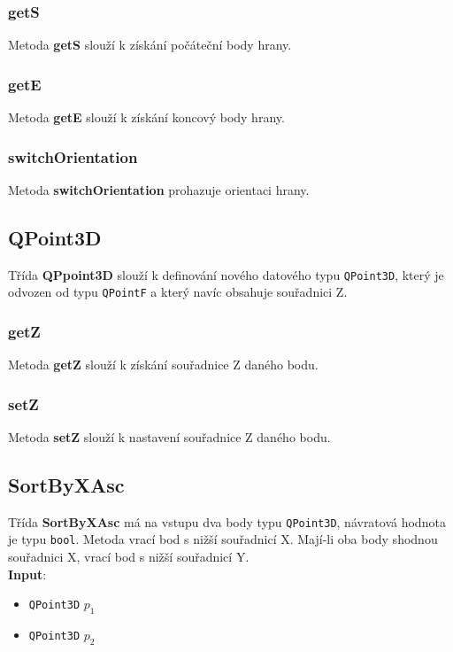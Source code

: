 \documentclass[a4paper, 12pt]{article}
\begin{document}
\subsubsection*{getS}
Metoda \textbf{getS} slouží k získání počáteční body hrany. 

\subsubsection*{getE}
Metoda \textbf{getE} slouží k získání koncový body hrany. 

\subsubsection*{switchOrientation}
Metoda \textbf{switchOrientation} prohazuje orientaci hrany.  


\subsection{QPoint3D}
Třída \textbf{QPpoint3D} slouží k definování nového datového typu \texttt{QPoint3D}, který je odvozen od typu \texttt{QPointF} a který navíc obsahuje souřadnici Z.

\subsubsection*{getZ}
Metoda \textbf{getZ} slouží k získání souřadnice Z daného bodu.

\subsubsection*{setZ}
Metoda \textbf{setZ} slouží k nastavení souřadnice Z daného bodu. 


\subsection{SortByXAsc}
Třída \textbf{SortByXAsc} má na vstupu dva body typu \texttt{QPoint3D}, návratová hodnota je typu \texttt{bool}. Metoda vrací bod s nižší  souřadnicí X. Mají-li oba body shodnou souřadnici X, vrací bod s nižší souřadnicí Y.\\

\textbf{Input}:
\begin{itemize}
\item \texttt{QPoint3D} $p_1$
\item \texttt{QPoint3D} $p_2$
\end{itemize}
\end{document}
